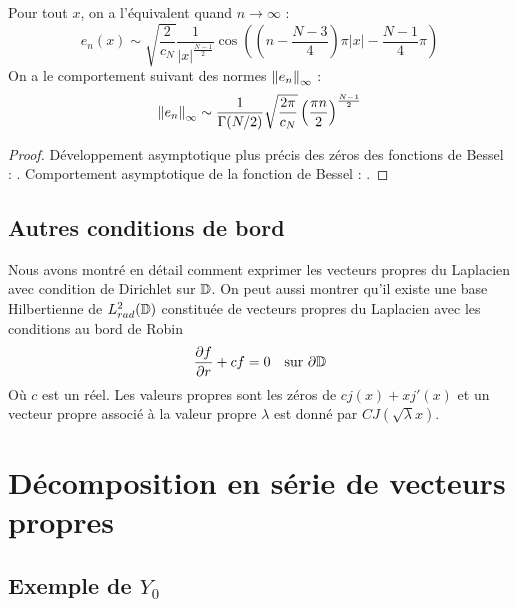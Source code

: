 \documentclass[11pt,a4paper]{article}
\begin{document}
\begin{Cor} Pour tout $x$, on a l'équivalent quand $n\to \infty$ : \[e_n(x) \sim  \sqrt{\dfrac{2}{c_N}}\dfrac{1}{|x|^{\frac{N-1}{2}}} \cos\left( \left(n - \dfrac{N-3}{4}\right)\pi |x| - \dfrac{N-1}{4} \pi\right)\]
On a le comportement suivant des normes $\left\|e_n\right\|_{\infty}$ : \[ \left\|e_n\right\|_{\infty} \sim \dfrac{1}{\Gamma(N/2)}\sqrt{\dfrac{2\pi}{c_N}} \left(\dfrac{\pi n}{2}\right)^{\frac{N-1}{2}}\]
\begin{proof}
Développement asymptotique plus précis des zéros des fonctions de Bessel : \cite{olver2010nist}. 
Comportement asymptotique de la fonction de Bessel : \cite{abramowitz1964handbook}.
\end{proof}
\end{Cor}

\subsection{Autres conditions de bord}

Nous avons montré en détail comment exprimer les vecteurs propres du Laplacien avec condition de Dirichlet sur $\mathbb{D}$. On peut aussi montrer qu'il existe une base Hilbertienne de $L^2_{rad}(\mathbb{D})$ constituée de vecteurs propres du Laplacien avec les conditions au bord de Robin
\[ \dfrac{\partial f}{\partial r} + c f = 0 \quad \textup{sur }\partial\mathbb{D}\]
Où $c$ est un réel. Les valeurs propres sont les zéros de $c j(x) + x j'(x)$ et un vecteur propre associé à la valeur propre $\lambda$ est donné par $ C J(\sqrt{\lambda}x)$. 

\section{Décomposition en série de vecteurs propres}

\subsection{Exemple de $Y_0$}
\end{document}
